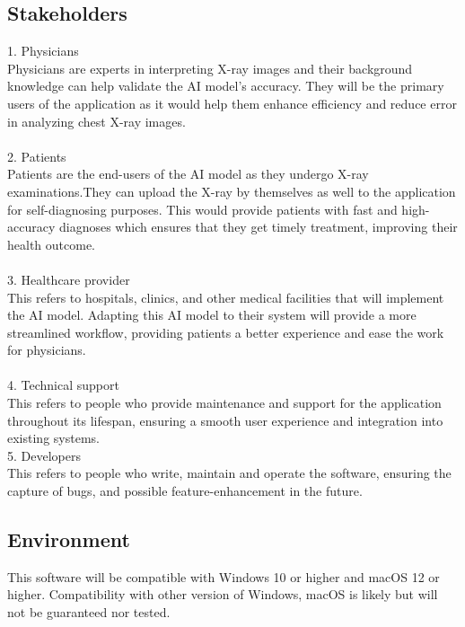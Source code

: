 \documentclass{article}
\begin{document}
\subsection{Stakeholders}
1. Physicians \\
Physicians are experts in interpreting X-ray images and their background knowledge can help validate the AI model's accuracy. They will be the primary users of the application as it would help them enhance efficiency and reduce error in analyzing chest X-ray images. \\
\\
2. Patients\\
Patients are the end-users of the AI model as they undergo X-ray examinations.They can upload the X-ray by themselves as well to the application for self-diagnosing purposes. This would provide patients with fast and high-accuracy diagnoses which ensures that they get timely treatment, improving their health outcome.\\
\\
3. Healthcare provider\\
This refers to  hospitals, clinics, and other medical facilities that will implement the AI model. Adapting this AI model to their system will provide a more streamlined workflow, providing patients a better experience and ease the work for physicians. \\
\\
4. Technical support\\
This refers to people who provide maintenance and support for the application throughout its lifespan, ensuring a smooth user experience and integration into existing systems.
\\
5. Developers\\
This refers to people who write, maintain and operate the software, ensuring the capture of bugs, and possible feature-enhancement in the future.
\\
\subsection{Environment}
This software will be compatible with Windows 10 or higher and macOS 12 or higher. Compatibility with other version of Windows, macOS is likely but will not be guaranteed nor tested.\\

\newpage
\end{document}

